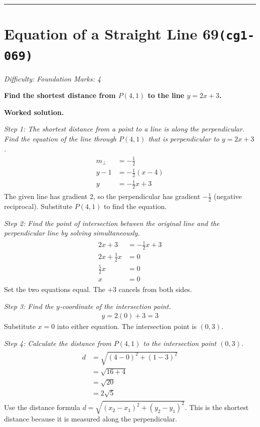 \documentclass[11pt]{article}
\newcommand{\question}[1]{\par\medskip\noindent\textbf{#1}\par}
\begin{document}
\medskip\hrule

\section*{Equation of a Straight Line 69\quad\small\texttt{(cg1-069)}}
\textit{Difficulty: Foundation \quad\textbar\quad Marks: 4}

\question{Find the shortest distance from \( P(4, 1) \) to the line \( y = 2x + 3 \).}

\textbf{Worked solution.}

\textit{Step 1: The shortest distance from a point to a line is along the perpendicular. Find the equation of the line through \(P(4, 1)\) that is perpendicular to \(y = 2x + 3\).}
\[\begin{gathered}
\begin{aligned} m_{\perp} &= -\frac{1}{2} \\ y - 1 &= -\frac{1}{2}(x - 4) \\ y &= -\frac{1}{2}x + 3 \end{aligned}
\end{gathered}\]
The given line has gradient 2, so the perpendicular has gradient \(-\frac{1}{2}\) (negative reciprocal). Substitute \(P(4, 1)\) to find the equation.

\textit{Step 2: Find the point of intersection between the original line and the perpendicular line by solving simultaneously.}
\[\begin{gathered}
\begin{aligned} 2x + 3 &= -\frac{1}{2}x + 3 \\ 2x + \frac{1}{2}x &= 0 \\ \frac{5}{2}x &= 0 \\ x &= 0 \end{aligned}
\end{gathered}\]
Set the two equations equal. The \(+3\) cancels from both sides.

\textit{Step 3: Find the \(y\)-coordinate of the intersection point.}
\[\begin{gathered}
y = 2(0) + 3 = 3
\end{gathered}\]
Substitute \(x = 0\) into either equation. The intersection point is \((0, 3)\).

\textit{Step 4: Calculate the distance from \(P(4, 1)\) to the intersection point \((0, 3)\).}
\[\begin{gathered}
\begin{aligned} d &= \sqrt{(4-0)^2 + (1-3)^2} \\ &= \sqrt{16 + 4} \\ &= \sqrt{20} \\ &= 2\sqrt{5} \end{aligned}
\end{gathered}\]
Use the distance formula \(d = \sqrt{(x_2 - x_1)^2 + (y_2 - y_1)^2}\). This is the shortest distance because it is measured along the perpendicular.
\end{document}
